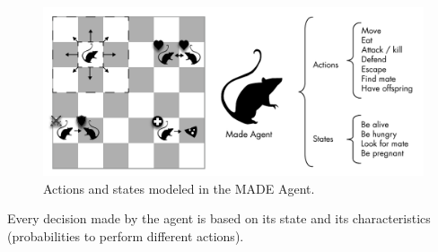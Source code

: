 \documentclass{sig-alternate}
\begin{document}
\begin{figure}
\begin{center}
\includegraphics[scale=0.35]{img/MadeAgent.pdf}
\caption{Actions and states modeled in the MADE Agent.}
\label{fig:madeAgent}
\end{center}
\end{figure}




Every
decision made by the agent is based on its state and its
characteristics (probabilities to perform different actions). %





\end{document}
